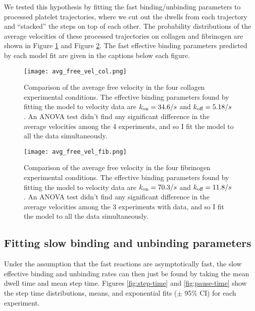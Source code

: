 \documentclass{article}
\newcommand{\tn}{\textnormal}
\begin{document}
We tested this hypothesis by fitting the fast binding/unbinding
parameters to processed platelet trajectories, where we cut out the
dwells from each trajectory and ``stacked'' the steps on top of each
other. The probability distributions of the average velocities of
these processed trajectories on collagen and fibrinogen are shown in
Figure \ref{fig:avg-free-vel-col} and Figure
\ref{fig:avg-free-vel-fib}. The fast effective binding parameters
predicted by each model fit are given in the captions below each figure.

\begin{figure}
  \centering
  \texttt{[image: avg\_free\_vel\_col.png]}
  \caption{Comparison of the average free velocity in the four
    collagen experimental conditions. The effective binding parameters
    found by fitting the model to velocity data are
    $k_\tn{on} = 34.6 / s$ and $k_\tn{off} = 5.18 / s$. An ANOVA test
    didn't find any significant difference in the average velocities
    among the 4 experiments, and so I fit the model to all the data
    simultaneously.}
  \label{fig:avg-free-vel-col}
\end{figure}

\begin{figure}
  \centering
  \texttt{[image: avg\_free\_vel\_fib.png]}
  \caption{Comparison of the average free velocity in the four
    fibrinogen experimental conditions. The effective binding
    parameters found by fitting the model to velocity data are
    $k_\tn{on} = 70.3 / s$ and $k_\tn{off} = 11.8 / s$. An ANOVA test
    didn't find any significant difference in the average velocities
    among the 3 experiments with data, and so I fit the model to all
    the data simultaneously.}
  \label{fig:avg-free-vel-fib}
\end{figure}

\subsection{Fitting slow binding and unbinding parameters}
\label{sec:fitting-slow-binding}

Under the assumption that the fast reactions are asymptotically fast,
the slow effective binding and unbinding rates can then just be found
by taking the mean dwell time and mean step time. Figures
\ref{fig:step-time} and \ref{fig:pause-time} show the step time
distributions, means, and exponential fits ($\pm$ 95\% CI) for each
experiment.
\end{document}
